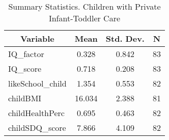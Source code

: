 
\begin{table}[htbp]\centering \caption{Summary Statistics. Children with Private Infant-Toddler Care \label{schoolChildasiloPriv}}
\begin{tabular}{l c c  c}\hline\hline
\multicolumn{1}{c}{\textbf{Variable}} & \textbf{Mean}
 & \textbf{Std. Dev.} & \textbf{N}\\ \hline
IQ\_factor & 0.328 & 0.842  & 83\\
IQ\_score & 0.718 & 0.208  & 83\\
likeSchool\_child & 1.354 & 0.553  & 82\\
childBMI & 16.034 & 2.388  & 81\\
childHealthPerc & 0.695 & 0.463  & 82\\
childSDQ\_score & 7.866 & 4.109  & 82\\
\hline\end{tabular}
\end{table}
